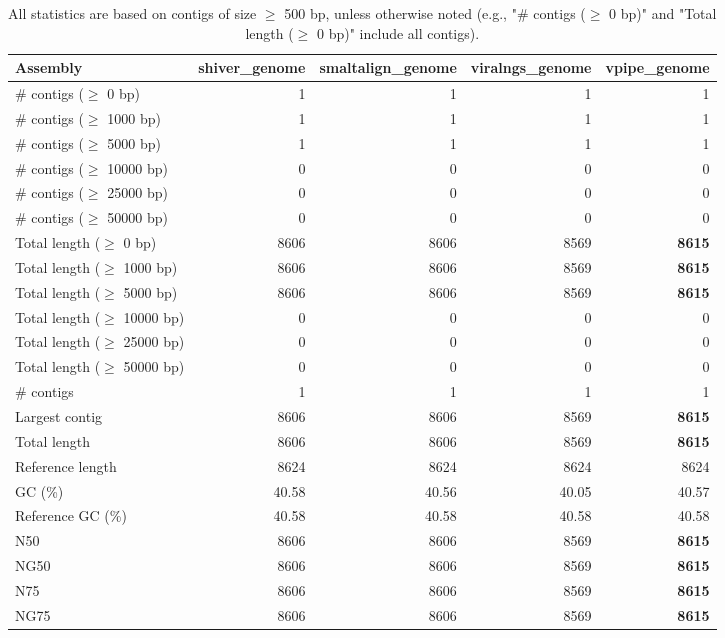 \documentclass[12pt,a4paper]{article}
\begin{document}
\begin{table}[ht]
\begin{center}
\caption{All statistics are based on contigs of size $\geq$ 500 bp, unless otherwise noted (e.g., "\# contigs ($\geq$ 0 bp)" and "Total length ($\geq$ 0 bp)" include all contigs).}
\begin{tabular}{|l*{4}{|r}|}
\hline
Assembly & shiver\_genome & smaltalign\_genome & viralngs\_genome & vpipe\_genome \\ \hline
\# contigs ($\geq$ 0 bp) & 1 & 1 & 1 & 1 \\ \hline
\# contigs ($\geq$ 1000 bp) & 1 & 1 & 1 & 1 \\ \hline
\# contigs ($\geq$ 5000 bp) & 1 & 1 & 1 & 1 \\ \hline
\# contigs ($\geq$ 10000 bp) & 0 & 0 & 0 & 0 \\ \hline
\# contigs ($\geq$ 25000 bp) & 0 & 0 & 0 & 0 \\ \hline
\# contigs ($\geq$ 50000 bp) & 0 & 0 & 0 & 0 \\ \hline
Total length ($\geq$ 0 bp) & 8606 & 8606 & 8569 & {\bf 8615} \\ \hline
Total length ($\geq$ 1000 bp) & 8606 & 8606 & 8569 & {\bf 8615} \\ \hline
Total length ($\geq$ 5000 bp) & 8606 & 8606 & 8569 & {\bf 8615} \\ \hline
Total length ($\geq$ 10000 bp) & 0 & 0 & 0 & 0 \\ \hline
Total length ($\geq$ 25000 bp) & 0 & 0 & 0 & 0 \\ \hline
Total length ($\geq$ 50000 bp) & 0 & 0 & 0 & 0 \\ \hline
\# contigs & 1 & 1 & 1 & 1 \\ \hline
Largest contig & 8606 & 8606 & 8569 & {\bf 8615} \\ \hline
Total length & 8606 & 8606 & 8569 & {\bf 8615} \\ \hline
Reference length & 8624 & 8624 & 8624 & 8624 \\ \hline
GC (\%) & 40.58 & 40.56 & 40.05 & 40.57 \\ \hline
Reference GC (\%) & 40.58 & 40.58 & 40.58 & 40.58 \\ \hline
N50 & 8606 & 8606 & 8569 & {\bf 8615} \\ \hline
NG50 & 8606 & 8606 & 8569 & {\bf 8615} \\ \hline
N75 & 8606 & 8606 & 8569 & {\bf 8615} \\ \hline
NG75 & 8606 & 8606 & 8569 & {\bf 8615} \\ \hline

\end{tabular}
\end{center}
\end{table}
\end{document}
